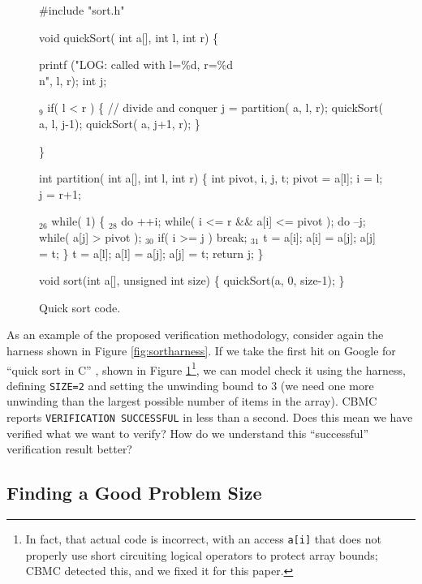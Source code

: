 \documentclass[conference]{IEEEtran}
\begin{document}
\begin{figure}
{\scriptsize
\begin{code}
 \#include "sort.h"

 void quickSort( int a[], int l, int r)
 \{

   printf ("LOG: called with l=\%d, r=\%d\\n", l, r); 
   int j;

{$_9$}  if( l < r ) 
     \{
       // divide and conquer
       j = partition( a, l, r);
       quickSort( a, l, j-1);
       quickSort( a, j+1, r);
     \}
  
 \}

 int partition( int a[], int l, int r) \{
   int pivot, i, j, t;
   pivot = a[l];
   i = l; j = r+1;
  
{$_{26}$} while( 1)
     \{
{$_{28}$}     do ++i; while( i <= r \&\& a[i] <= pivot );
       do --j; while( a[j] > pivot );
{$_{30}$}     if( i >= j ) break;
{$_{31}$}     t = a[i]; a[i] = a[j]; a[j] = t;
     \}
   t = a[l]; a[l] = a[j]; a[j] = t;
   return j;
 \}


 void sort(int a[], unsigned int size) \{
   quickSort(a, 0, size-1);
 \}
\end{code}
}
\caption{Quick sort code.}
\label{fig:qsort}
\end{figure}

As an example of the proposed verification methodology, consider again
the harness shown in Figure \ref{fig:sortharness}.  If we take the
first hit on Google for ``quick sort in C'' \cite{quicksortcode},
shown in Figure \ref{fig:qsort}\footnote{In fact, that actual code is
  incorrect, with an access {\tt a[i]} that does not properly use
  short circuiting logical operators to protect array bounds; CBMC
  detected this, and we fixed it for this paper.}, we can model check
it using the harness, defining {\tt SIZE=2} and setting the unwinding
bound to 3 (we need one more unwinding than the largest possible
number of items in the array).  CBMC reports {\tt VERIFICATION
  SUCCESSFUL} in less than a second.  Does this mean we have verified
what we want to verify?  How do we understand this ``successful''
verification result better?

\subsection{Finding a Good Problem Size}
\label{sec:unwind}
\end{document}
